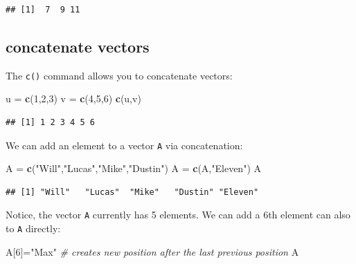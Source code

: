 \documentclass[
]{book}
\newenvironment{Shaded}{\begin{snugshade}}{\end{snugshade}}
\newcommand{\CommentTok}[1]{\textcolor[rgb]{0.56,0.35,0.01}{\textit{#1}}}
\newcommand{\DecValTok}[1]{\textcolor[rgb]{0.00,0.00,0.81}{#1}}
\newcommand{\FunctionTok}[1]{\textcolor[rgb]{0.13,0.29,0.53}{\textbf{#1}}}
\newcommand{\NormalTok}[1]{#1}
\newcommand{\OtherTok}[1]{\textcolor[rgb]{0.56,0.35,0.01}{#1}}
\newcommand{\StringTok}[1]{\textcolor[rgb]{0.31,0.60,0.02}{#1}}
\theoremstyle{definition}
\theoremstyle{definition}
\theoremstyle{definition}
\theoremstyle{definition}
\theoremstyle{remark}
\begin{document}
\begin{verbatim}
## [1]  7  9 11
\end{verbatim}

\subsection{concatenate vectors}\label{concatenate-vectors}

The \texttt{c()} command allows you to concatenate vectors:

\begin{Shaded}
\begin{Highlighting}[]
\NormalTok{u }\OtherTok{=} \FunctionTok{c}\NormalTok{(}\DecValTok{1}\NormalTok{,}\DecValTok{2}\NormalTok{,}\DecValTok{3}\NormalTok{)}
\NormalTok{v }\OtherTok{=} \FunctionTok{c}\NormalTok{(}\DecValTok{4}\NormalTok{,}\DecValTok{5}\NormalTok{,}\DecValTok{6}\NormalTok{)}
\FunctionTok{c}\NormalTok{(u,v)}
\end{Highlighting}
\end{Shaded}

\begin{verbatim}
## [1] 1 2 3 4 5 6
\end{verbatim}

We can add an element to a vector \texttt{A} via concatenation:

\begin{Shaded}
\begin{Highlighting}[]
\NormalTok{A }\OtherTok{=} \FunctionTok{c}\NormalTok{(}\StringTok{"Will"}\NormalTok{,}\StringTok{"Lucas"}\NormalTok{,}\StringTok{"Mike"}\NormalTok{,}\StringTok{"Dustin"}\NormalTok{)}
\NormalTok{A }\OtherTok{=} \FunctionTok{c}\NormalTok{(A,}\StringTok{"Eleven"}\NormalTok{)}
\NormalTok{A}
\end{Highlighting}
\end{Shaded}

\begin{verbatim}
## [1] "Will"   "Lucas"  "Mike"   "Dustin" "Eleven"
\end{verbatim}

Notice, the vector \texttt{A} currently has 5 elements. We can add a 6th element can also to \texttt{A} directly:

\begin{Shaded}
\begin{Highlighting}[]
\NormalTok{A[}\DecValTok{6}\NormalTok{]}\OtherTok{=}\StringTok{"Max"} \CommentTok{\# creates new position after the last previous position}
\NormalTok{A}
\end{Highlighting}
\end{Shaded}
\end{document}
